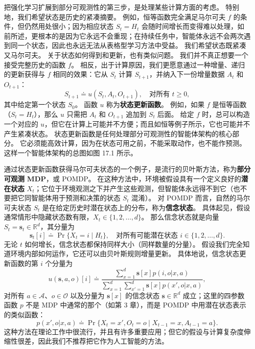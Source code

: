\documentclass[UTF8,12pt,a4paper,fontset=fandol]{ctexart}
\begin{document}
把强化学习扩展到部分可观测性的第三步，是处理某些计算方面的考虑。
特别地，我们希望状态是历史的紧凑摘要。
例如，恒等函数完全满足马尔可夫 $f$ 的条件，但仍然用处很小；因为相应状态 $S_t=H_t$ 会随时间增长而变得难以处理，如前所述，更根本的是因为它永远不会重现；在持续任务中，智能体永远不会两次遇到同一个状态，因此也永远无法从表格型学习方法中受益。
我们希望状态既紧凑又马尔可夫。
关于状态如何得到和更新，也有类似问题。
我们并不真正想要一个接受完整历史的函数 $f$。
相反，出于计算原因，我们更愿意通过一种增量、递归的更新获得与 $f$ 相同的效果：它从 $S_t$ 计算 $S_{t+1}$，并纳入下一份增量数据 $A_t$ 和 $O_{t+1}$：
\begin{equation}
S_{t+1}\doteq u(S_t,A_t,O_{t+1}),\quad \text{对所有 }t\ge 0,
\tag{17.8}
\end{equation}
其中给定第一个状态 $S_0$。
函数 $u$ 称为\textbf{状态更新函数}。
例如，如果 $f$ 是恒等函数（$S_t=H_t$），那么 $u$ 只需把 $A_t$ 和 $O_{t+1}$ 追加到 $S_t$ 后面。
给定 $f$ 时，总可以构造一个对应的 $u$，但它在计算上可能并不方便；而且如恒等例子所示，它也可能并不产生紧凑状态。
状态更新函数是任何处理部分可观测性的智能体架构的核心部分。
它必须能高效计算，因为在状态可用之前，不能采取动作，也不能作预测。
这样一个智能体架构的总图如图 17.1 所示。

通过状态更新函数获得马尔可夫状态的一个例子，是流行的贝叶斯方法，称为\textbf{部分可观测 MDP}，或 POMDP。
在这种方法中，环境被假设具有一个定义良好的\textbf{潜在状态} $X_t$；它位于环境观测之下并产生这些观测，但智能体永远得不到它（也不要把它同智能体用于预测和决策的状态 $S_t$ 混淆）。
对 POMDP 而言，自然的马尔可夫状态 $S_t$ 是在给定历史时潜在状态上的分布，称为\textbf{信念状态}。
具体起见，假设通常情形中隐藏状态数有限，$X_t\in\{1,2,\ldots,d\}$。
那么信念状态就是向量 $S_t=\mathbf{s}_t\in\mathbb{R}^d$，其分量为
\[
\mathbf{s}_t[i]\doteq \Pr\{X_t=i\mid H_t\},
\quad \text{对所有可能潜在状态 }i\in\{1,2,\ldots,d\}.
\]
无论 $t$ 如何增长，信念状态都保持同样大小（同样数量的分量）。
假设我们完全知道环境内部如何运作，它还可以由贝叶斯规则增量更新。
具体地说，信念状态更新函数的第 $i$ 个分量为
\begin{equation}
u(\mathbf{s},a,o)[i]\doteq
\frac{\sum_{x=1}^{d}\mathbf{s}[x]p(i,o|x,a)}
{\sum_{x=1}^{d}\sum_{x'=1}^{d}\mathbf{s}[x]p(x',o|x,a)},
\tag{17.9}
\end{equation}
对所有 $a\in\mathcal{A}$、$o\in\mathcal{O}$ 以及分量为 $\mathbf{s}[x]$ 的信念状态 $\mathbf{s}\in\mathbb{R}^d$ 成立；这里的四参数函数 $p$ 不是 MDP 中通常的那个（如第 3 章），而是 POMDP 中用潜在状态表示的类似函数：
\[
p(x',o|x,a)\doteq \Pr\{X_t=x',O_t=o\mid X_{t-1}=x,A_{t-1}=a\}.
\]
这种方法在理论工作中很流行，并且有许多重要应用；但它的假设与计算复杂度伸缩性很差，因此我们不推荐把它作为人工智能的方法。
\end{document}
